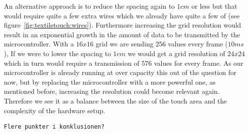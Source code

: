 An alternative approach is to reduce the spacing again to \(1cm\) or less but that would require quite a few extra wires which we already have quite a few of (see figure~\ref{fig:textiletouch:wires}).
Furthermore increasing the grid resolution would result in an exponential growth in the amount of data to be transmitted by the microcontroller.
With a \(16x16\) grid we are sending 256 values every frame (\(10ms\)),
If we were to lower the spacing to \(1cm\) we would get a grid resolution of \(24x24\) which in turn would require a transmission of 576 values for every frame.
As our microcontroller is already running at over capacity this out of the question for now, but by replacing the microcontroller with a more powerful one, as mentioned before, increasing the resolution could become relevant again.
Therefore we see it as a balance between the size of the touch area and the complexity of the hardware setup.

\begin{verbatim}
Flere punkter i konklusionen?
\end{verbatim}
